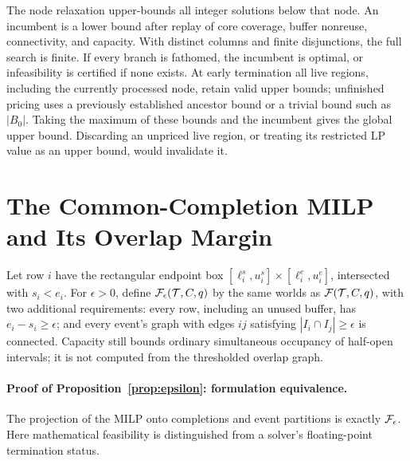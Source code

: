 The node relaxation upper-bounds all integer solutions below that node.
An incumbent is a lower bound after replay of core coverage, buffer nonreuse,
connectivity, and capacity. With distinct columns and finite disjunctions,
the full search is finite. If every branch is fathomed, the incumbent is
optimal, or infeasibility is certified if none exists. At early termination
all live regions, including the currently processed node, retain valid upper
bounds; unfinished pricing uses a previously established ancestor bound or a
trivial bound such as $|B_0|$. Taking the maximum of these bounds and the
incumbent gives the global upper bound. Discarding an unpriced live region,
or treating its restricted LP value as an upper bound, would invalidate it.

\section{The Common-Completion MILP and Its Overlap Margin}
\label{app:epsilon-equivalence}
Let row $i$ have the rectangular endpoint box
$[\ell_i^s,u_i^s]\times[\ell_i^e,u_i^e]$, intersected with $s_i<e_i$.
For $\epsilon>0$, define $\mathcal F_\epsilon(\mathcal T,C,q)$ by the same worlds as
$\mathcal F(\mathcal T,C,q)$, with two additional requirements: every row, including an
unused buffer, has $e_i-s_i\ge\epsilon$; and every event's graph with edges
$ij$ satisfying $|I_i\cap I_j|\ge\epsilon$ is connected. Capacity still
bounds ordinary simultaneous occupancy of half-open intervals; it is not
computed from the thresholded overlap graph.

\paragraph{Proof of Proposition~\ref{prop:epsilon}: formulation equivalence.}
The projection of the MILP onto completions and event partitions is exactly
$\mathcal F_\epsilon$. Here mathematical feasibility is distinguished from a solver's
floating-point termination status.

